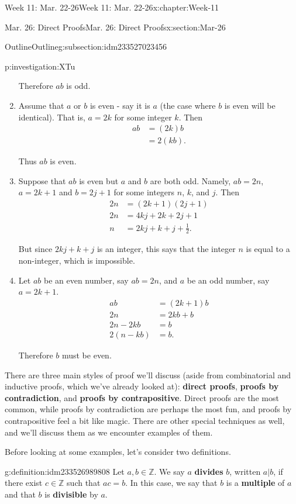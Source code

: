 \documentclass[oneside,10pt,]{book}
\newcommand{\terminology}[1]{\textbf{#1}}
\numberwithin{equation}{section}
\def\Z{{\mathbb Z}}
\newcommand{\Z}{\mathbb Z}
\newcommand{\amp}{&}
\begin{document}
\begin{chapterptx}{Week 11: Mar. 22-26}{}{Week 11: Mar. 22-26}{}{}{x:chapter:Week-11}
\begin{sectionptx}{Mar. 26: Direct Proofs}{}{Mar. 26: Direct Proofs}{}{}{x:section:Mar-26}
\begin{subsectionptx}{Outline}{}{Outline}{}{}{g:subsection:idm233527023456}
\begin{investigation}{}{p:investigation:XTu}
\begin{enumerate}
%
\par
Therefore \(ab\) is odd.%
\item{}Assume that \(a\) or \(b\) is even - say it is \(a\) (the case where \(b\) is even will be identical). That is, \(a=2k\) for some integer \(k\). Then%
\begin{align*}
ab \amp =(2k)b\\
\amp =2(kb)\text{.}
\end{align*}
%
\par
Thus \(ab\) is even.%
\item{}Suppose that \(ab\) is even but \(a\) and \(b\) are both odd. Namely, \(ab = 2n\), \(a=2k+1\) and \(b=2j+1\) for some integers \(n\), \(k\), and \(j\). Then%
\begin{align*}
2n \amp =(2k+1)(2j+1)\\
2n \amp =4kj+2k+2j+1\\
n \amp = 2kj+k+j+\frac{1}{2}\text{.}
\end{align*}
%
\par
But since \(2kj+k+j\) is an integer, this says that the integer \(n\) is equal to a non-integer, which is impossible.%
\item{}Let \(ab\) be an even number, say \(ab=2n\), and \(a\) be an odd number, say \(a=2k+1\).%
\begin{align*}
ab \amp =(2k+1)b\\
2n \amp =2kb+b\\
2n-2kb\amp =b\\
2(n-kb)\amp =b\text{.}
\end{align*}
%
\par
Therefore \(b\) must be even.%
\end{enumerate}
%
\end{investigation}%
There are three main styles of proof we'll discuss (aside from combinatorial and inductive proofs, which we've already looked at): \terminology{direct proofs}, \terminology{proofs by contradiction}, and \terminology{proofs by contrapositive}. Direct proofs are the most common, while proofs by contradiction are perhaps the most fun, and proofs by contrapositive feel a bit like magic. There are other special techniques as well, and we'll discuss them as we encounter examples of them.%
\par
Before looking at some examples, let's consider two definitions.%
\begin{definition}{}{g:definition:idm233526989808}%
Let \(a,b\in\Z\). We say \(a\) \terminology{divides} \(b\), written \(a | b\), if there exist \(c\in\Z\) such that \(ac = b\). In this case, we say that \(b\) is a \terminology{multiple} of \(a\) and that \(b\) is \terminology{divisible} by \(a\).%

\end{definition}
\end{subsectionptx}
\end{sectionptx}
\end{chapterptx}
\end{document}

